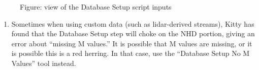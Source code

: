 \documentclass[letterpaper,10pt,english]{sphinxmanual}
\begin{document}
\begin{figure}[htbp]
\centering
\capstart

\noindent{}
\caption{Figure: view of the Database Setup script inputs}\label{\detokenize{ex_1:id7}}\end{figure}
\begin{enumerate}
\def\theenumi{\arabic{enumi}}
\def\labelenumi{\theenumi .}
\makeatletter\def\p@enumii{\p@enumi \theenumi .}\makeatother
\setcounter{enumi}{10}
\item {} 
Sometimes when using custom data (such as lidar-derived streams), Kitty has found that the Database Setup step will choke on the NHD portion, giving an error about “missing M values.” It is possible that M values are missing, or it is possible this is a red herring. In that case, use the “Database Setup No M Values” tool instead.

\end{enumerate}
\end{document}

